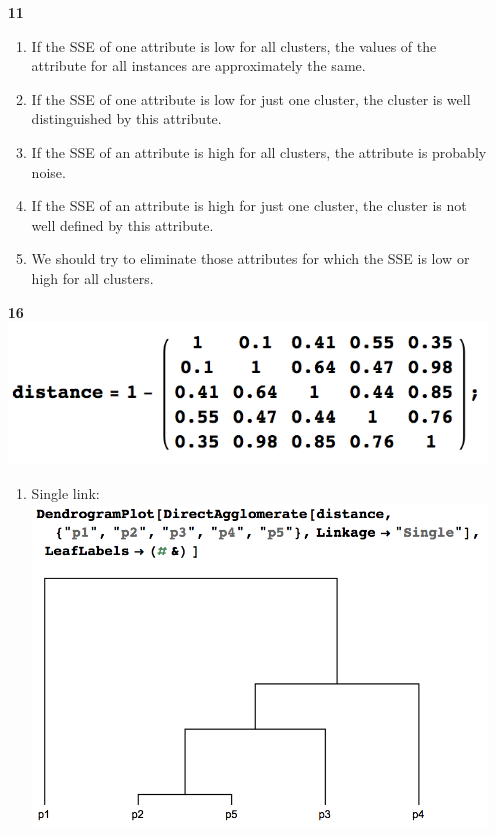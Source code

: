 \documentclass[12pt]{report}
\begin{document}
\begin{enumerate}
	\item [\textbf{11}]
	\begin{enumerate}
		\item 
		If the SSE of one attribute is low for all clusters, the values of the attribute for all instances are approximately the same.
		\item 
		If the SSE of one attribute is low for just one cluster, the cluster is well distinguished by this attribute.
		\item 
		If the SSE of an attribute is high for all clusters, the attribute is probably noise.
		\item 
		If the SSE of an attribute is high for just one cluster, the cluster is not well defined by this attribute.
		\item 
		We should try to eliminate those attributes for which the SSE is low or high for all clusters.
	\end{enumerate}

	\item [\textbf{16}]
	\includegraphics[scale=0.7,valign=t]{16.png}
	\begin{enumerate}
		\item Single link:\\
		\includegraphics[scale=0.7,valign=t]{16a.png}
		

\end{enumerate}
\end{enumerate}
\end{document}
